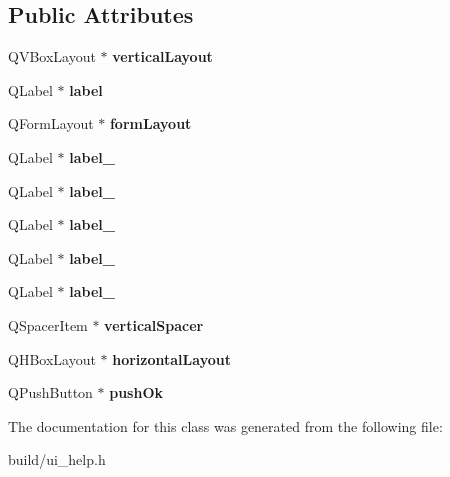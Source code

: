 \subsection*{Public Attributes}
\begin{DoxyCompactItemize}
\item 
\hypertarget{class_ui___dialog_a02f973813b741621c5461918b3d9d4bb}{}Q\+V\+Box\+Layout $\ast$ {\bfseries vertical\+Layout}\label{class_ui___dialog_a02f973813b741621c5461918b3d9d4bb}

\item 
\hypertarget{class_ui___dialog_ac3844fd0281707dc5535826da7506ca5}{}Q\+Label $\ast$ {\bfseries label}\label{class_ui___dialog_ac3844fd0281707dc5535826da7506ca5}

\item 
\hypertarget{class_ui___dialog_ad9cfb27ad75b6ac3776d697f97825b71}{}Q\+Form\+Layout $\ast$ {\bfseries form\+Layout}\label{class_ui___dialog_ad9cfb27ad75b6ac3776d697f97825b71}

\item 
\hypertarget{class_ui___dialog_a0f20bebec836535dc4cfcc33647dd2aa}{}Q\+Label $\ast$ {\bfseries label\+\_}\label{class_ui___dialog_a0f20bebec836535dc4cfcc33647dd2aa}

\item 
\hypertarget{class_ui___dialog_a30b8516534f30c4241a55e3fb9dcd766}{}Q\+Label $\ast$ {\bfseries label\+\_}\label{class_ui___dialog_a30b8516534f30c4241a55e3fb9dcd766}

\item 
\hypertarget{class_ui___dialog_a640f65059bf215b0096f894e7ace21e3}{}Q\+Label $\ast$ {\bfseries label\+\_}\label{class_ui___dialog_a640f65059bf215b0096f894e7ace21e3}

\item 
\hypertarget{class_ui___dialog_a18eabf425290cd39fd1dd7d830e05483}{}Q\+Label $\ast$ {\bfseries label\+\_}\label{class_ui___dialog_a18eabf425290cd39fd1dd7d830e05483}

\item 
\hypertarget{class_ui___dialog_acfbb1773ba7dc7aa425b0b3b8981686a}{}Q\+Label $\ast$ {\bfseries label\+\_}\label{class_ui___dialog_acfbb1773ba7dc7aa425b0b3b8981686a}

\item 
\hypertarget{class_ui___dialog_a5272f4a31affb22b7118cd47e5a96002}{}Q\+Spacer\+Item $\ast$ {\bfseries vertical\+Spacer}\label{class_ui___dialog_a5272f4a31affb22b7118cd47e5a96002}

\item 
\hypertarget{class_ui___dialog_ae66a1da203f045e33d71ed5abd46d2a1}{}Q\+H\+Box\+Layout $\ast$ {\bfseries horizontal\+Layout}\label{class_ui___dialog_ae66a1da203f045e33d71ed5abd46d2a1}

\item 
\hypertarget{class_ui___dialog_a49b7348eff7151fb59e3a939c144b237}{}Q\+Push\+Button $\ast$ {\bfseries push\+Ok}\label{class_ui___dialog_a49b7348eff7151fb59e3a939c144b237}

\end{DoxyCompactItemize}


The documentation for this class was generated from the following file\+:\begin{DoxyCompactItemize}
\item 
build/ui\+\_\+help.\+h\end{DoxyCompactItemize}

